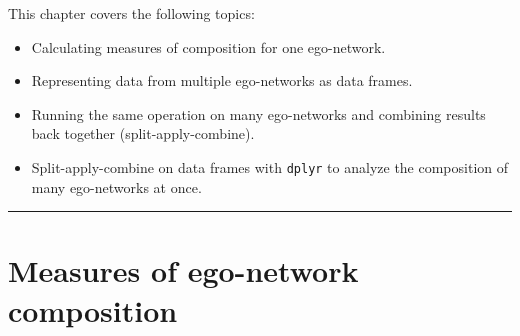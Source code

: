 \documentclass[
]{book}
\providecommand{\tightlist}{%
  \setlength{\itemsep}{0pt}\setlength{\parskip}{0pt}}
\begin{document}
This chapter covers the following topics:

\begin{itemize}
\tightlist
\item
  Calculating measures of composition for one ego-network.
\item
  Representing data from multiple ego-networks as data frames.
\item
  Running the same operation on many ego-networks and combining results back together (split-apply-combine).
\item
  Split-apply-combine on data frames with \texttt{dplyr} to analyze the composition of many ego-networks at once.
\end{itemize}

\begin{center}\rule{0.5\linewidth}{0.5pt}\end{center}

\hypertarget{measures-of-ego-network-composition}{%
\section{Measures of ego-network composition}\label{measures-of-ego-network-composition}}
\end{document}
